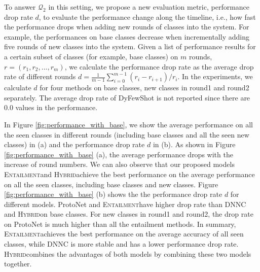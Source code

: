 \documentclass[11pt]{article}
\newcommand{\modelname}{\textsc{Entailment}}
\newcommand{\hybrid}{\textsc{Hybrid}}
\begin{document}
To answer $\mathcal{Q}_2$ in this setting, we propose a new evaluation metric, performance drop rate $d$, to evaluate the performance change along the timeline, i.e., how fast the performance drops when adding new rounds of classes into the system. For example, the performances on base classes decrease when incrementally adding five rounds of new classes into the system. Given a list of performance results for a certain subset of classes (for example, base classes) on $m$ rounds, $r = (r_1, r_2, ..., r_m)$, we calculate the performance drop rate as the average drop rate of different rounds $d =\frac{1}{m-1}  \sum_{i=0}^{m-1} (r_i - r_{i+1}) / r_i $. In the experiments, we calculate $d$ for four methods on base classes, new classes in round1 and round2 separately. The average drop rate of DyFewShot is not reported since there are 0.0 values in the performance. 

In Figure \ref{fig:performance_with_base}, we show the average performance on all the seen classes in different rounds (including base classes and all the seen new classes) in (a) and the performance drop rate $d$ in (b). As shown in Figure \ref{fig:performance_with_base} (a), the average performance drops with the increase of round numbers. We can also observe that our proposed models \modelname\enspace and \hybrid\enspace achieve the best performance on the average performance on all the seen classes, including base classes and new classes.
Figure \ref{fig:performance_with_base} (b) shows the the performance drop rate $d$ for different models. ProtoNet and \modelname\enspace have higher drop rate than DNNC and \hybrid\enspace on base classes.
For new classes in round1 and round2, the drop rate on ProtoNet is much higher than all the entailment methods. In summary, \modelname\enspace achieves the best performance on the average accuracy of all seen classes, while DNNC is more stable and has a lower performance drop rate. \hybrid\enspace combines the advantages of both models by combining these two models together.


\end{document}
